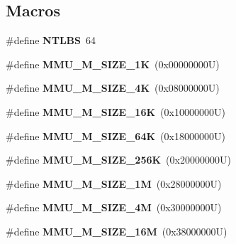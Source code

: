 \subsection*{Macros}
\begin{DoxyCompactItemize}
\item 
\mbox{\label{group__Virtex4MMU_ga6b9035b3670554050186b28fb406b05f}} 
\#define {\bfseries N\+T\+L\+BS}~64
\item 
\mbox{\label{group__Virtex4MMU_gaff12d131dbcb3e46046d9db338d01e5c}} 
\#define {\bfseries M\+M\+U\+\_\+\+M\+\_\+\+S\+I\+Z\+E\+\_\+1K}~(0x00000000\+U)
\item 
\mbox{\label{group__Virtex4MMU_ga9593e6212ae063429b9b637fec5236d1}} 
\#define {\bfseries M\+M\+U\+\_\+\+M\+\_\+\+S\+I\+Z\+E\+\_\+4K}~(0x08000000\+U)
\item 
\mbox{\label{group__Virtex4MMU_ga79970320e390936333d3604d9611a0ca}} 
\#define {\bfseries M\+M\+U\+\_\+\+M\+\_\+\+S\+I\+Z\+E\+\_\+16K}~(0x10000000\+U)
\item 
\mbox{\label{group__Virtex4MMU_ga62c568adff1815458791e45f3a6f54a1}} 
\#define {\bfseries M\+M\+U\+\_\+\+M\+\_\+\+S\+I\+Z\+E\+\_\+64K}~(0x18000000\+U)
\item 
\mbox{\label{group__Virtex4MMU_ga4416efcc6c3ad0d5f892f20133561f0f}} 
\#define {\bfseries M\+M\+U\+\_\+\+M\+\_\+\+S\+I\+Z\+E\+\_\+256K}~(0x20000000\+U)
\item 
\mbox{\label{group__Virtex4MMU_ga8d714512fdf6ad00cc927a1698e26d40}} 
\#define {\bfseries M\+M\+U\+\_\+\+M\+\_\+\+S\+I\+Z\+E\+\_\+1M}~(0x28000000\+U)
\item 
\mbox{\label{group__Virtex4MMU_ga913bb0de8ac81a63893066d44718b4b4}} 
\#define {\bfseries M\+M\+U\+\_\+\+M\+\_\+\+S\+I\+Z\+E\+\_\+4M}~(0x30000000\+U)
\item 
\mbox{\label{group__Virtex4MMU_gab5c598db590ccd9f369973d3aa897949}} 
\#define {\bfseries M\+M\+U\+\_\+\+M\+\_\+\+S\+I\+Z\+E\+\_\+16M}~(0x38000000\+U)
\item 

\end{DoxyCompactItemize}
